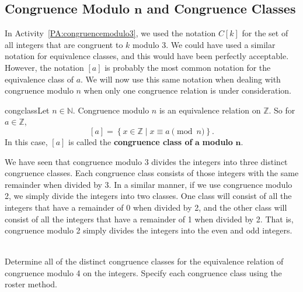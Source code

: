 \subsection*{Congruence Modulo $\boldsymbol{n}$ and Congruence Classes}
In \typeu Activity~\ref*{PA:congruencemodulo3}, we used the notation  $C[ k ]$ for the set of all integers that are congruent to  $k$  modulo  3.  We could have used a similar notation for equivalence classes, and this would have been perfectly acceptable.  However, the notation  
$[ a ]$  is probably the most common notation for the equivalence class of  $a$.  We will now use this same notation when dealing with congruence modulo  $n$ when only one congruence relation is under consideration.

\begin{defbox}{congclass}{Let  $n \in \mathbb{N}$.  Congruence modulo  $n$  is an equivalence relation on  $\mathbb{Z}$.  So for  $a \in \mathbb{Z}$,
\[
[ a ] = \left\{ { {x \in \mathbb{Z} } \mid x \equiv a \pmod n} \right\}\!.
\]
In this case, $[ a ]$ 
\label{sym:conclass} is called the \textbf{congruence class of}
%
  $\boldsymbol{a}$  \textbf{modulo}  $\boldsymbol{n}$.}
\end{defbox}
%
We have seen that congruence modulo 3 divides the integers into three distinct congruence classes.  Each congruence class consists of those integers with the same remainder when divided by 3.  In a similar manner, if we use congruence modulo 2, we simply divide the integers into two classes.  One class will consist of all the integers that have a remainder of 0 when divided by 2, and the other class will consist of all the integers that have a remainder of 1 when divided by 2.  That is, congruence modulo 2 simply divides the integers into the even and odd integers.
\hbreak

\begin{prog} \label{prog:congmod4} \hfill \\
Determine all of the distinct congruence classes for the equivalence relation of congruence modulo 4 on the integers.  Specify each congruence class using the roster method.
\end{prog}
\hbreak

\endinput
